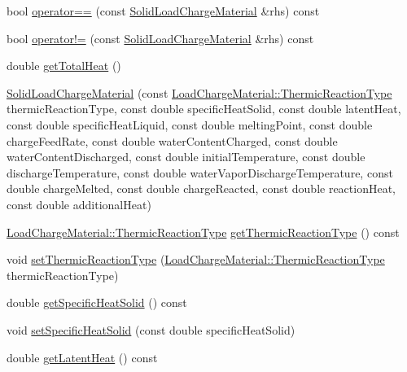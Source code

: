\begin{DoxyCompactItemize}
\item 
bool \hyperlink{class_solid_load_charge_material_aacf2f41ce38067a52fb7d8456a05a699}{operator==} (const \hyperlink{class_solid_load_charge_material}{Solid\+Load\+Charge\+Material} \&rhs) const
\item 
bool \hyperlink{class_solid_load_charge_material_abb07f23a4dc3bfacabd2080b14034248}{operator!=} (const \hyperlink{class_solid_load_charge_material}{Solid\+Load\+Charge\+Material} \&rhs) const
\item 
double \hyperlink{class_solid_load_charge_material_af8593eb758c64236a8a026d6145584f4}{get\+Total\+Heat} ()
\item 
\hyperlink{class_solid_load_charge_material_a9145db5518b94cfc1919b8d6ff809f5e}{Solid\+Load\+Charge\+Material} (const \hyperlink{class_load_charge_material_a51d4263e865a5d86236622dd3fe23fd1}{Load\+Charge\+Material\+::\+Thermic\+Reaction\+Type} thermic\+Reaction\+Type, const double specific\+Heat\+Solid, const double latent\+Heat, const double specific\+Heat\+Liquid, const double melting\+Point, const double charge\+Feed\+Rate, const double water\+Content\+Charged, const double water\+Content\+Discharged, const double initial\+Temperature, const double discharge\+Temperature, const double water\+Vapor\+Discharge\+Temperature, const double charge\+Melted, const double charge\+Reacted, const double reaction\+Heat, const double additional\+Heat)
\item 
\hyperlink{class_load_charge_material_a51d4263e865a5d86236622dd3fe23fd1}{Load\+Charge\+Material\+::\+Thermic\+Reaction\+Type} \hyperlink{class_solid_load_charge_material_a11708312a99ab985d980e1e521e0864c}{get\+Thermic\+Reaction\+Type} () const
\item 
void \hyperlink{class_solid_load_charge_material_ae2f85e0fbeff9f72b808bf86e645797f}{set\+Thermic\+Reaction\+Type} (\hyperlink{class_load_charge_material_a51d4263e865a5d86236622dd3fe23fd1}{Load\+Charge\+Material\+::\+Thermic\+Reaction\+Type} thermic\+Reaction\+Type)
\item 
double \hyperlink{class_solid_load_charge_material_af84f1f7dd167f67c0c02206339bbfe27}{get\+Specific\+Heat\+Solid} () const
\item 
void \hyperlink{class_solid_load_charge_material_ad9d2e3668a6a14700f4dced4882f98c0}{set\+Specific\+Heat\+Solid} (const double specific\+Heat\+Solid)
\item 
double \hyperlink{class_solid_load_charge_material_add60191bd282a9cefa4bf7a60301711b}{get\+Latent\+Heat} () const
\item 

\end{DoxyCompactItemize}
